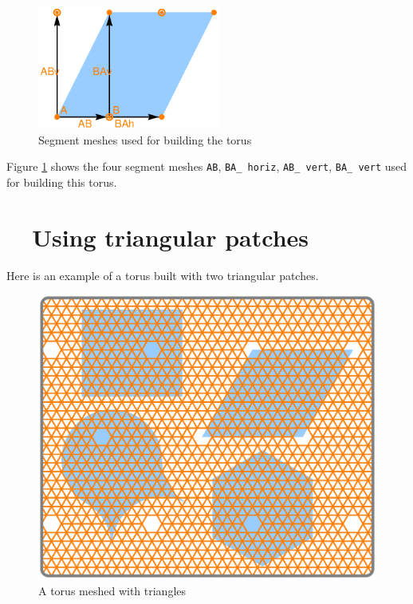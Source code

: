 \begin{figure}[ht] \centering
  \includegraphics[width=60mm]{torus-sketch.eps}
  \caption{Segment meshes used for building the torus}
  \label{\numb section 7.\numb fig 5}
\end{figure}

Figure \ref{\numb section 7.\numb fig 5} shows the four segment meshes {\small\tt AB},
{\small\tt BA\_\,horiz}, {\small\tt AB\_\,vert}, {\small\tt BA\_\,vert} used for
building this torus.



\section{~~Using triangular patches}\label{\numb section 7.\numb parag 9}

Here is an example of a torus built with two triangular patches.

\begin{figure}[ht] \centering
  \includegraphics[width=115mm]{flat-torus-5.eps}
  \caption{A torus meshed with triangles}
  \label{\numb section 7.\numb fig 6}
\end{figure}

